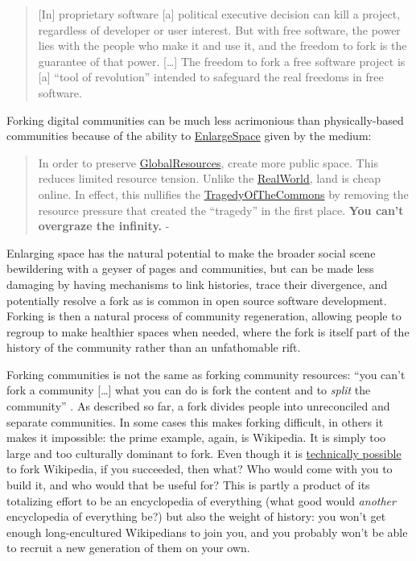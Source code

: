 \begin{quote}
{[}In{]} proprietary software {[}a{]} political executive decision can
kill a project, regardless of developer or user interest. But with free
software, the power lies with the people who make it and use it, and the
freedom to fork is the guarantee of that power. {[}\ldots{]} The freedom
to fork a free software project is {[}a{]} ``tool of revolution''
intended to safeguard the real freedoms in free software. \citep{hancockOpenOfficeOrgDead2010} 
\end{quote}

Forking digital communities can be much less acrimonious than
physically-based communities because of the ability to
\href{http://meatballwiki.org/wiki/EnlargeSpace}{EnlargeSpace} given by
the medium:

\begin{quote}
In order to preserve
\href{http://meatballwiki.org/wiki/GlobalResource}{GlobalResources},
create more public space. This reduces limited resource tension. Unlike
the \href{http://meatballwiki.org/wiki/RealWorld}{RealWorld}, land is
cheap online. In effect, this nullifies the
\href{http://meatballwiki.org/wiki/GlobalResource}{TragedyOfTheCommons}
by removing the resource pressure that created the ``tragedy'' in the
first place. \textbf{You can't overgraze the infinity.} - \citep{MeatballWikiEnlargeSpace} 
\end{quote}

Enlarging space has the natural potential to make the broader social
scene bewildering with a geyser of pages and communities, but can be
made less damaging by having mechanisms to link histories, trace their
divergence, and potentially resolve a fork as is common in open source
software development. Forking is then a natural process of community
regeneration, allowing people to regroup to make healthier spaces when
needed, where the fork is itself part of the history of the community
rather than an unfathomable rift.

Forking communities is not the same as forking community resources:
``you can't fork a community {[}\ldots{]} what you can do is fork the
content and to \emph{split} the community'' \citep{MeatballWikiForkingOfOnlineCommunitiesa} . As described so far, a
fork divides people into unreconciled and separate communities. In some
cases this makes forking difficult, in others it makes it impossible:
the prime example, again, is Wikipedia. It is simply too large and too
culturally dominant to fork. Even though it is
\href{https://en.wikipedia.org/wiki/Wikipedia:FAQ/Forking\#Am_I_allowed_to_fork_Wikipedia?}{technically
possible} to fork Wikipedia, if you succeeded, then what? Who would come
with you to build it, and who would that be useful for? This is partly a
product of its totalizing effort to be an encyclopedia of everything
(what good would \emph{another} encyclopedia of everything be?) but also
the weight of history: you won't get enough long-encultured Wikipedians
to join you, and you probably won't be able to recruit a new generation
of them on your own.

